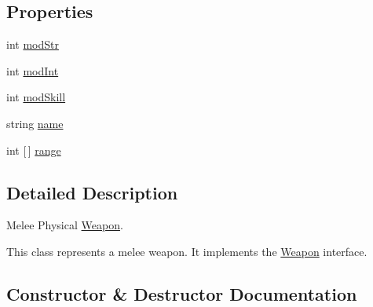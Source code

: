 \subsection*{Properties}
\begin{DoxyCompactItemize}
\item 
int \hyperlink{class_model_1_1_weapon_module_1_1_bronze_sword_aa1c6e28081a2ad10cdadec4bb0a527e2}{mod\+Str}
\item 
int \hyperlink{class_model_1_1_weapon_module_1_1_bronze_sword_ab87b55d8ac8623f036c66750992731b6}{mod\+Int}
\item 
int \hyperlink{class_model_1_1_weapon_module_1_1_bronze_sword_a3e8726ed62fac8f48ce08ce4abb92f19}{mod\+Skill}
\item 
string \hyperlink{class_model_1_1_weapon_module_1_1_bronze_sword_ae8545ac8a18b0bbab5d8ddad7fc9b2e0}{name}
\item 
int \mbox{[}$\,$\mbox{]} \hyperlink{class_model_1_1_weapon_module_1_1_bronze_sword_aa4760d927116d93aa66a0d29779bbea2}{range}
\end{DoxyCompactItemize}


\subsection{Detailed Description}
Melee Physical \hyperlink{interface_model_1_1_weapon_module_1_1_weapon}{Weapon}. 

This class represents a melee weapon. It implements the \hyperlink{interface_model_1_1_weapon_module_1_1_weapon}{Weapon} interface. 

\subsection{Constructor \& Destructor Documentation}
\hypertarget{class_model_1_1_weapon_module_1_1_bronze_sword_afca5f581369ec99d88d3dafa9be47e59}{}\label{class_model_1_1_weapon_module_1_1_bronze_sword_afca5f581369ec99d88d3dafa9be47e59} 
